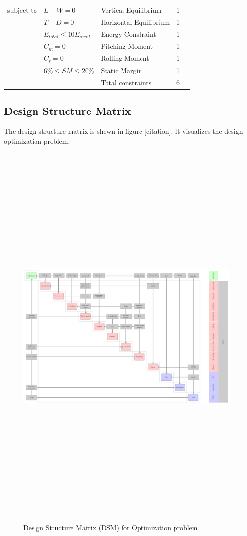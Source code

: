 \documentclass[conf]{new-aiaa}
\begin{document}
\begin{table}[!hbt]
\begin{tabular}{r l l c c}
        \hline
        subject to
        & $L-W=0$ & Vertical Equilibrium & 1 \\
        & $T-D=0$ & Horizontal Equilibrium & 1 \\
        & $E_{total} \le 10E_{avail}$ & Energy Constraint & 1\\
        & $C_{m}=0$ & Pitching Moment  & 1 \\
        & $C_{r}=0$ & Rolling Moment & 1 \\
        & $6\% \leq SM \leq 20\%$ & Static Margin & 1 \\
        \cline{3-5}
        && Total constraints & 6 & \\
        \hline
    \end{tabular}
    \label{tab:optprob}
\end{table}
\pagebreak

\pagebreak
\subsection{Design Structure Matrix}
The design structure matrix is shown in figure [citation]. It visualizes the design optimization problem.
\begin{figure}[!hbt]
    \centering
    \includegraphics[angle=90, height=20cm] {images/a_2_dsm.pdf}
    \caption{Design Structure Matrix (DSM) for Optimization problem}
    \label{fig:my_label}
\end{figure}
\pagebreak
\end{document}
